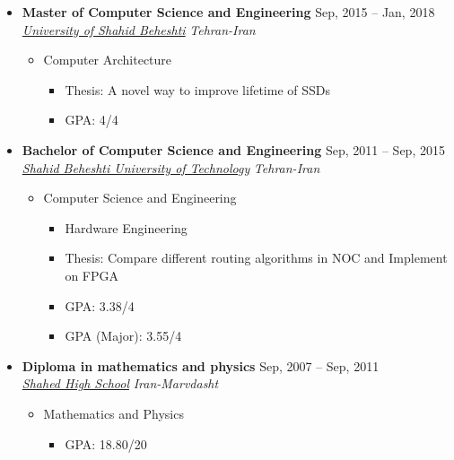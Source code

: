 \documentclass[10pt,a4paper,sans]{moderncv} %
\begin{document}
	\begin{itemize}
		\item \textbf{Master of Computer Science and Engineering} \hfill Sep, 2015 -- Jan, 2018 \\ 
		\href{https://sbu.ac.ir/Cols/CSE/Pages/default.aspx/}{ \emph{University of Shahid Beheshti}} \hfill \emph{Tehran-Iran}
		\begin{itemize}
			\item Computer Architecture \hspace{10 pt}  %
			\begin{itemize}
				\item Thesis: A novel way to improve lifetime of SSDs
				\item GPA: 4/4 \\
			\end{itemize}
		\end{itemize}
		\vspace{-1 em}
		\item \textbf{Bachelor of Computer Science and Engineering} \hfill Sep, 2011 -- Sep, 2015 \\
		\href{https://sbu.ac.ir/Cols/CSE/Pages/default.aspx/}{ \emph{Shahid Beheshti University of Technology}} \hfill \emph{Tehran-Iran}
		\begin{itemize}
			\item Computer Science and Engineering
			\begin{itemize}		
				\item Hardware Engineering \hspace{10 pt} 
				\item Thesis: Compare different routing algorithms in NOC and Implement on FPGA 
				\item GPA: 3.38/4
				\item GPA (Major): 3.55/4
			\end{itemize}
		\end{itemize}

		\item \textbf{Diploma in mathematics and physics} \hfill Sep, 2007 -- Sep, 2011 \\ 
		\href{https://#/}{ \emph{Shahed High School}} \hfill \emph{Iran-Marvdasht}
		\begin{itemize}
			\item Mathematics and Physics \hspace{10 pt}  %
			\begin{itemize}
				\item GPA: 18.80/20 \\
			\end{itemize}
		\end{itemize}
	\end{itemize}
\end{document}
